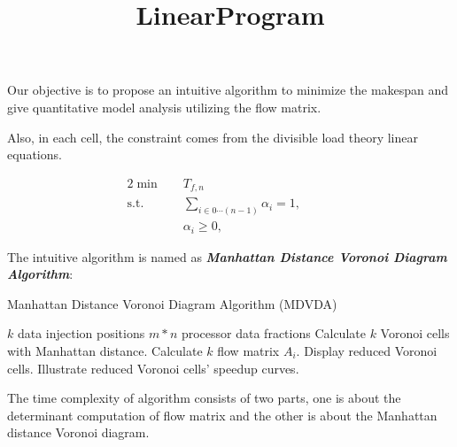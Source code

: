 Our objective is to propose an intuitive algorithm to minimize the makespan and give quantitative model analysis utilizing the flow matrix.  

Also, in each cell, the constraint comes from the divisible load theory linear equations.   

\title{LinearProgram}
\maketitle
\begin{alignat}{2}
\min\quad & T_{f,n}\\
\mbox{s.t.}\quad
&\sum_{i \in 0 \cdots (n-1)} \alpha_{i} = 1, &\quad& \\
&\alpha_{i} \geq 0, &{}&
\end{alignat}

The intuitive algorithm is named as \textbf{\textit{Manhattan Distance Voronoi Diagram Algorithm}}:
\begin{algorithm}
\caption{Manhattan Distance Voronoi Diagram Algorithm (MDVDA)}
\begin{algorithmic} 
\renewcommand{\algorithmicrequire}{\textbf{Input:}}
\renewcommand{\algorithmicensure}{\textbf{Output:}}
\REQUIRE $k$ data injection positions
\ENSURE $m*n$ processor data fractions
\STATE Calculate $k$ Voronoi cells with Manhattan distance.
\STATE Calculate $k$ flow matrix $A_{i}$.
\STATE Display reduced Voronoi cells.
\STATE Illustrate reduced Voronoi cells' speedup curves.
\end{algorithmic}
\end{algorithm}

The time complexity of algorithm consists of two parts, one is about the determinant computation of flow matrix and the other is about the Manhattan distance Voronoi diagram. 


